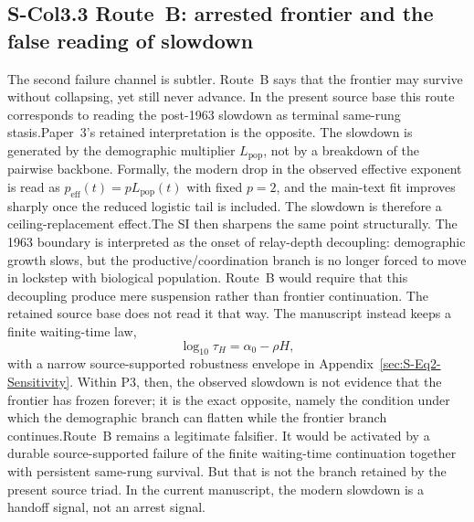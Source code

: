 \documentclass[11pt]{article}
\begin{document}
\subsection*{S-Col3.3 Route~B: arrested frontier and the false reading of slowdown}
\label{sec:S-Col3.3}The second failure channel is subtler. Route~B says that the frontier may survive without collapsing, yet still never advance. In the present source base this route corresponds to reading the post-1963 slowdown as terminal same-rung stasis.Paper~3's retained interpretation is the opposite. The slowdown is generated by the demographic multiplier $L_{\mathrm{pop}}$, not by a breakdown of the pairwise backbone. Formally, the modern drop in the observed effective exponent is read as $p_{\mathrm{eff}}(t)=pL_{\mathrm{pop}}(t)$ with fixed $p=2$, and the main-text fit improves sharply once the reduced logistic tail is included. The slowdown is therefore a ceiling-replacement effect.The SI then sharpens the same point structurally. The 1963 boundary is interpreted as the onset of relay-depth decoupling: demographic growth slows, but the productive/coordination branch is no longer forced to move in lockstep with biological population. Route~B would require that this decoupling produce mere suspension rather than frontier continuation. The retained source base does not read it that way. The manuscript instead keeps a finite waiting-time law,\[\log_{10}\tau_H=\alpha_0-\rho H,\]with a narrow source-supported robustness envelope in Appendix~\ref{sec:S-Eq2-Sensitivity}. Within P3, then, the observed slowdown is not evidence that the frontier has frozen forever; it is the exact opposite, namely the condition under which the demographic branch can flatten while the frontier branch continues.Route~B remains a legitimate falsifier. It would be activated by a durable source-supported failure of the finite waiting-time continuation together with persistent same-rung survival. But that is not the branch retained by the present source triad. In the current manuscript, the modern slowdown is a handoff signal, not an arrest signal.
\end{document}
